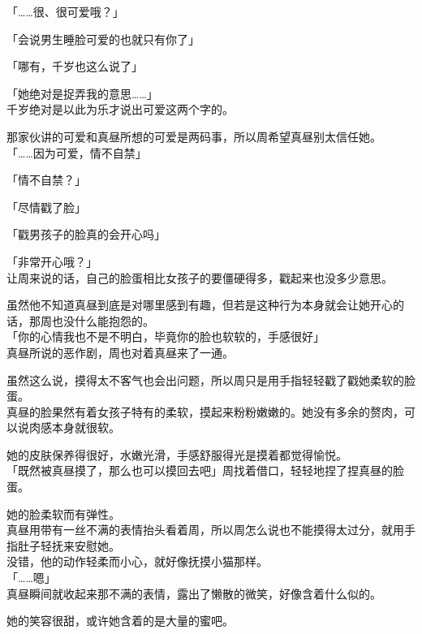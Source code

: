 「……很、很可爱哦？」

「会说男生睡脸可爱的也就只有你了」

「哪有，千岁也这么说了」

「她绝对是捉弄我的意思……」\\

千岁绝对是以此为乐才说出可爱这两个字的。

那家伙讲的可爱和真昼所想的可爱是两码事，所以周希望真昼别太信任她。\\

「……因为可爱，情不自禁」

「情不自禁？」

「尽情戳了脸」

「戳男孩子的脸真的会开心吗」

「非常开心哦？」\\

让周来说的话，自己的脸蛋相比女孩子的要僵硬得多，戳起来也没多少意思。

虽然他不知道真昼到底是对哪里感到有趣，但若是这种行为本身就会让她开心的话，那周也没什么能抱怨的。\\

「你的心情我也不是不明白，毕竟你的脸也软软的，手感很好」\\

真昼所说的恶作剧，周也对着真昼来了一通。

虽然这么说，摸得太不客气也会出问题，所以周只是用手指轻轻戳了戳她柔软的脸蛋。\\

真昼的脸果然有着女孩子特有的柔软，摸起来粉粉嫩嫩的。她没有多余的赘肉，可以说肉感本身就很软。

她的皮肤保养得很好，水嫩光滑，手感舒服得光是摸着都觉得愉悦。\\

「既然被真昼摸了，那么也可以摸回去吧」周找着借口，轻轻地捏了捏真昼的脸蛋。

她的脸柔软而有弹性。\\

真昼用带有一丝不满的表情抬头看着周，所以周怎么说也不能摸得太过分，就用手指肚子轻抚来安慰她。\\

没错，他的动作轻柔而小心，就好像抚摸小猫那样。\\

「……嗯」\\

真昼瞬间就收起来那不满的表情，露出了懒散的微笑，好像含着什么似的。

她的笑容很甜，或许她含着的是大量的蜜吧。\\

